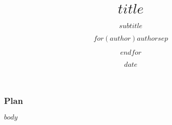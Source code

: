 \documentclass[10pt,t]{beamer}
\title{$title$}
\subtitle{$subtitle$}
\author{$for(author)$$author$$sep$ \and $endfor$}
\date{$date$}
\begin{document}
\begin{frame}[plain]
  \titlepage
\end{frame}

\begin{frame}
  \frametitle{Plan}
  \tableofcontents %
\end{frame}

$body$
\end{document}
